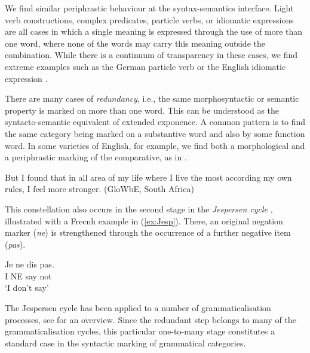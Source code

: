 \documentclass[output=paper]{langscibook}
\begin{document}
We find similar periphrastic behaviour at the syntax-semantics
interface.  Light verb constructions, complex predicates, particle
verbs, or idiomatic expressions are all cases in which a single
meaning is expressed through the use of more than one word, where
none of the words may carry this meaning outside the
combination.  While there is a continuum of transparency in these
cases, we find extreme examples such as the German particle verb
 or the English idiomatic expression
.

There are many cases of \emph{redundancy}, i.e., the same
morphosyntactic or semantic property is marked on more than one
word. This can be understood as the syntacto-semantic equivalent of
extended exponence. A common pattern is to find the same category
being marked on a substantive word and also by some function word.  In
some varieties of English, for example, we find both a morphological
and a periphrastic marking of the comparative, as in
.

\ea
But I found that in all area of my life where I live the most according my own rules, I feel more stronger. (GloWbE, South Africa)\label{more-comp-sa}
\z 

This constellation also occurs in the second stage in the
\emph{Jespersen cycle} \citep{Jespersen:17}, illustrated with a Frecnh
example in (\ref{ex:Jesp}).  There, an original
negation marker (\textit{ne}) is strengthened through the occurrence of a further
negative item (\textit{pas}).

\ea \label{ex:Jesp}
\gll Je ne dis pas.\\
I NE say not\\
\glt `I don't say' \citep[7]{Jespersen:17}
\z 

The Jespersen cycle has been applied to a number of grammaticalisation
processes, see \citet{Gelderen:11,Gelderen:13} for an overview.  Since
the redundant step belongs to many of the grammaticalisation cycles,
this particular one-to-many stage constitutes a standard case in the
syntactic marking of grammatical categories.

\end{document}
